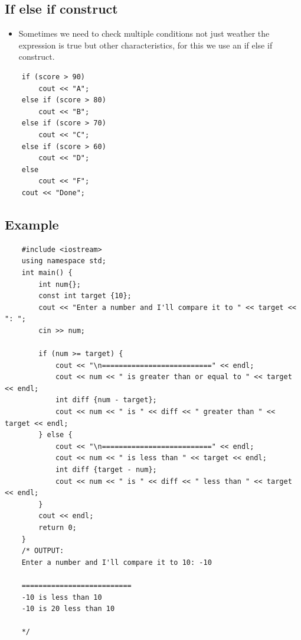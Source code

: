 \subsection{If else if construct}
\begin{itemize}
    \item Sometimes we need to check multiple conditions not just weather the expression is true but other characteristics, for this we use an if else if construct.
\end{itemize}
\begin{verbatim}
    if (score > 90)
        cout << "A";
    else if (score > 80)
        cout << "B";
    else if (score > 70)
        cout << "C";
    else if (score > 60)
        cout << "D";
    else
        cout << "F";
    cout << "Done";
\end{verbatim}

\subsection{Example}
\begin{verbatim}
    #include <iostream>
    using namespace std;
    int main() {
        int num{};
        const int target {10};
        cout << "Enter a number and I'll compare it to " << target << ": ";
        cin >> num;

        if (num >= target) {
            cout << "\n==========================" << endl;
            cout << num << " is greater than or equal to " << target << endl;
            int diff {num - target};
            cout << num << " is " << diff << " greater than " << target << endl;
        } else {
            cout << "\n==========================" << endl;
            cout << num << " is less than " << target << endl;
            int diff {target - num};
            cout << num << " is " << diff << " less than " << target << endl;
        }
        cout << endl;
        return 0;
    }
    /* OUTPUT:
    Enter a number and I'll compare it to 10: -10

    ==========================
    -10 is less than 10
    -10 is 20 less than 10

    */
\end{verbatim}


